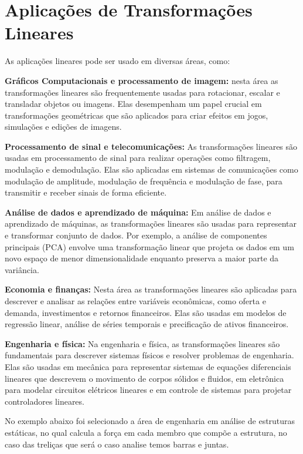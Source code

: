 \chapter{Aplicações de Transformações Lineares}
	As aplicações lineares pode ser usado em diversas áreas, como:
	\nocite{sirlandro2017}   

\textbf{Gráficos Computacionais e processamento de imagem:} nesta área as transformações lineares são frequentemente usadas para rotacionar, escalar e transladar objetos ou imagens. Elas desempenham um papel crucial em transformações geométricas que são aplicados para criar efeitos em jogos, simulações e edições de imagens. \nocite{strang2010}

\textbf{Processamento de sinal e telecomunicações:} As transformações lineares são usadas em processamento de sinal para realizar operações como filtragem, modulação e demodulação. Elas são aplicadas em sistemas de comunicações como modulação de amplitude, modulação de frequência e modulação de fase, para transmitir e receber sinais de forma eficiente.  \nocite{pitombeira1971}

\textbf{Análise de dados e aprendizado de máquina:} Em análise de dados e aprendizado de máquinas, as transformações lineares são usadas para representar e transformar conjunto de dados. Por exemplo, a análise de componentes principais (PCA) envolve uma transformação linear que projeta os dados em um novo espaço de menor dimensionalidade enquanto preserva a maior parte da variância.

\textbf{Economia e finanças:} Nesta área as transformações lineares são aplicadas para descrever e analisar as relações entre variáveis econômicas, como oferta e demanda, investimentos e retornos financeiros. Elas são usadas em modelos de regressão linear, análise de séries temporais e precificação de ativos financeiros. \nocite{figueiredo2009}

\textbf{Engenharia e física:} Na engenharia e física, as transformações lineares são fundamentais para descrever sistemas físicos e resolver problemas de engenharia. Elas são usadas em mecânica para representar sistemas de equações diferenciais lineares que descrevem o movimento de corpos sólidos e fluidos, em eletrônica para modelar circuitos elétricos lineares e em controle de sistemas para projetar controladores lineares.

No exemplo abaixo foi selecionado a área de engenharia em análise de estruturas estáticas, no qual calcula a força em cada membro que compõe a estrutura, no caso das treliças que será o caso analise temos barras e juntas.
 
